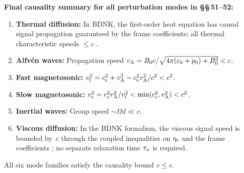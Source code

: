 \begin{causalitycheck}
\textbf{Final causality summary for all perturbation modes in
\S\S\,51--52:}
\begin{enumerate}
\item \textbf{Thermal diffusion:} In BDNK, the first-order heat
  equation has causal signal propagation guaranteed by the frame
  coefficients; all thermal characteristic speeds $\le c$
  \citep{BemficaDN2018,Kovtun2019}.
\item \textbf{Alfv\'en waves:} Propagation speed
  $v_{\mathrm{A}} = B_{0}c/\sqrt{4\pi(\varepsilon_{0}+p_{0})+B_{0}^{2}} < c$.
\item \textbf{Fast magnetosonic:} $v_{\mathrm{f}}^{2}=c_{\mathrm{s}}^{2}+v_{\mathrm{A}}^{2}
  -c_{\mathrm{s}}^{2}v_{\mathrm{A}}^{2}/c^{2} < c^{2}$.
\item \textbf{Slow magnetosonic:} $v_{\mathrm{s}}^{2}=c_{\mathrm{s}}^{2}v_{\mathrm{A}}^{2}/v_{\mathrm{f}}^{2}
  < \min(c_{\mathrm{s}}^{2},v_{\mathrm{A}}^{2}) < c^{2}$.
\item \textbf{Inertial waves:} Group speed $\sim\Omega d\ll c$.
\item \textbf{Viscous diffusion:} In the BDNK formalism, the viscous
  signal speed is bounded by~$c$ through the coupled inequalities on
  $\eta_{\mathrm{s}}$ and the frame coefficients
  \citep{BemficaDNK2023}; no separate relaxation
  time $\tau_{\pi}$ is required.
\end{enumerate}
All six mode families satisfy the causality bound $v\le c$.
\end{causalitycheck}
